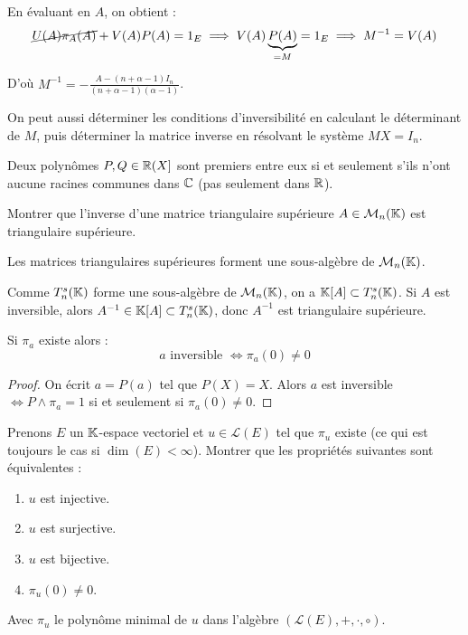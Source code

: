 \documentclass[11pt,a4paper]{report}
\begin{document}
\begin{example}
    En évaluant en $A$, on obtient :
    \[
        \cancel{U(A)\pi_A(A)} + V(A)P(A) = 1_E \implies V(A)\underbrace{P(A)}_{=M} = 1_E \implies M^{-1} = V(A)
    \]

    D'où $M^{-1} = -\frac{A - (n+\alpha -1)I_n}{(n+\alpha -1)(\alpha - 1)}$.

    On peut aussi déterminer les conditions d'inversibilité en calculant le déterminant de $M$, puis déterminer la matrice inverse en résolvant le système $MX = I_n$.
\end{example}

\begin{rappel}
    Deux polynômes $P,Q \in \mathbb{R}(X]$ sont premiers entre eux si et seulement s'ils n'ont aucune racines communes dans $\mathbb{C}$ (pas seulement dans $\mathbb{R}$).
\end{rappel}

\begin{exercise}
    \label{exo:inverse-triangulaire}
    Montrer que l'inverse d'une matrice triangulaire supérieure $A \in \mathcal M_n(\mathbb{K})$ est triangulaire supérieure.
\end{exercise}

\begin{rappel}
    Les matrices triangulaires supérieures forment une sous-algèbre de $\mathcal M_n(\mathbb{K})$.
\end{rappel}

\begin{correction}
    Comme $T_n^s(\mathbb{K})$ forme une sous-algèbre de $\mathcal M_n(\mathbb{K})$, on a $\mathbb{K}[A] \subset T_n^s(\mathbb{K})$. Si $A$ est inversible, alors $A^{-1} \in \mathbb{K}[A] \subset T_n^s(\mathbb{K})$, donc $A^{-1}$ est triangulaire supérieure.
\end{correction}

\begin{remark}
    Si $\pi_a$ existe alors :
    $$a \text{ inversible } \iff \pi_a(0) \ne 0$$
\end{remark}

\begin{proof}
    On écrit $a = P(a)$ tel que $P(X) = X$. Alors $a$ est inversible $\iff P \wedge \pi_a = 1$ si et seulement si $\pi_a(0) \ne 0$.
\end{proof}

\begin{exercise}
    \label{exo:equivalence-injectif-surjectif}
    Prenons $E$ un $\mathbb{K}$-espace vectoriel et $u \in \mathcal L(E)$ tel que $\pi_u$ existe (ce qui est toujours le cas si $\dim(E) < \infty$). Montrer que les propriétés suivantes sont équivalentes :
    \begin{enumerate}[label=(\roman*)]
        \item $u$ est injective.
        \item $u$ est surjective.
        \item $u$ est bijective.
        \item $\pi_u(0) \ne 0$.
    \end{enumerate}
    Avec $\pi_u$ le polynôme minimal de $u$ dans l'algèbre $(\mathcal L(E), +, \cdot, \circ)$.
\end{exercise}
\end{document}
